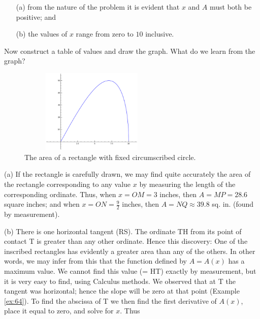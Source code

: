 \begin{example}
{\begin{itemize}
\item[(a)] from the nature of the problem it is 
evident that $x$ and $A$ must both be positive; and

\item[(b)] 
the values of $x$ range from zero to $10$ inclusive.
\end{itemize}
Now construct a table of values and draw the graph.
What do we learn from the graph?

\begin{figure}[h!]
\begin{minipage}{\textwidth}
\begin{center}
\includegraphics[height=4cm,width=7cm]{circle-example2.eps}
\end{center}
\end{minipage}
\caption{The area of a rectangle with fixed circumscribed circle.}
\label{fig:circle-example2}
\end{figure}

(a) If the rectangle is carefully drawn, we may find quite accurately the area 
of the rectangle corresponding to any value $x$ by measuring 
the length of the corresponding ordinate. Thus,
when 	$x = OM = 3$ inches,
then 	$A = MP = 28.6$ square inches;
and when 	$x = ON = \frac{9}{2}$ inches,
then 	$A = NQ \approx 39.8$ sq. in. (found by measurement).

(b) There is one horizontal tangent (RS). The ordinate TH from its 
point of contact T is greater than any other ordinate. Hence this 
discovery: One of the inscribed rectangles has evidently a 
greater area than any of the others. In other words, we may 
infer from this that the function defined by $A=A(x)$ has a maximum 
value. We cannot find this value (= HT) exactly by measurement, 
but it is very easy to find, using Calculus methods. We 
observed that at T the tangent was horizontal; hence the 
slope will be zero at that point (Example \ref{ex:64}). %
To find the abscissa of T we then find the first 
derivative of $A(x)$, place it equal to zero, and solve for $x$. Thus

}
\end{example}
